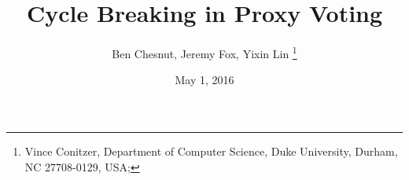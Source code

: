 \documentclass{sig-alternate-10}
\begin{document}
  
\title{Cycle Breaking in Proxy Voting
}
\date{May 1, 2016}

\author{
Ben Chesnut, Jeremy Fox, Yixin Lin \thanks{%
Vince Conitzer, Department of Computer Science, Duke University, Durham, NC
27708-0129, USA;}}

\maketitle
%






\end{document}
